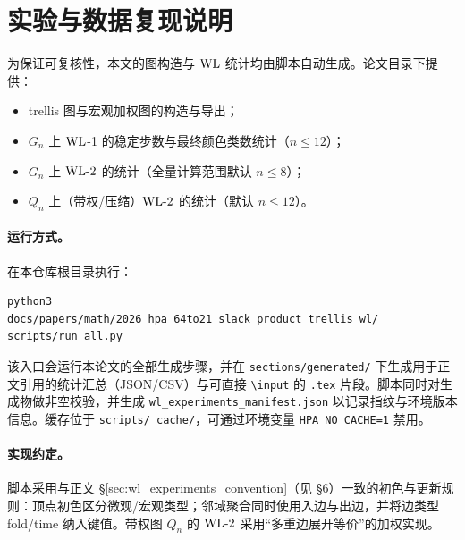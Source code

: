 
\section{实验与数据复现说明}

为保证可复核性，本文的图构造与 $\mathrm{WL}$ 统计均由脚本自动生成。论文目录下提供：
\begin{itemize}
  \item trellis 图与宏观加权图的构造与导出；
  \item $G_n$ 上 $\mathrm{WL}$-1 的稳定步数与最终颜色类数统计（$n\le 12$）；
  \item $G_n$ 上 $\mathrm{WL}\text{-}2$ 的统计（全量计算范围默认 $n\le 8$）；
  \item $Q_n$ 上（带权/压缩）$\mathrm{WL}\text{-}2$ 的统计（默认 $n\le 12$）。
\end{itemize}

\paragraph{运行方式。}
在本仓库根目录执行：
\begin{verbatim}
python3
docs/papers/math/2026_hpa_64to21_slack_product_trellis_wl/
scripts/run_all.py
\end{verbatim}
该入口会运行本论文的全部生成步骤，并在 \texttt{sections/generated/} 下生成用于正文引用的统计汇总（JSON/CSV）与可直接 \texttt{\textbackslash input} 的 \texttt{.tex} 片段。脚本同时对生成物做非空校验，并生成 \texttt{wl\_experiments\_manifest.json} 以记录指纹与环境版本信息。缓存位于 \texttt{scripts/\_cache/}，可通过环境变量 \texttt{HPA\_NO\_CACHE=1} 禁用。

\paragraph{实现约定。}
脚本采用与正文 \S\ref{sec:wl_experiments_convention}（见 \S6）一致的初色与更新规则：顶点初色区分微观/宏观类型；邻域聚合同时使用入边与出边，并将边类型 fold/time 纳入键值。带权图 $Q_n$ 的 $\mathrm{WL}\text{-}2$ 采用“多重边展开等价”的加权实现。

